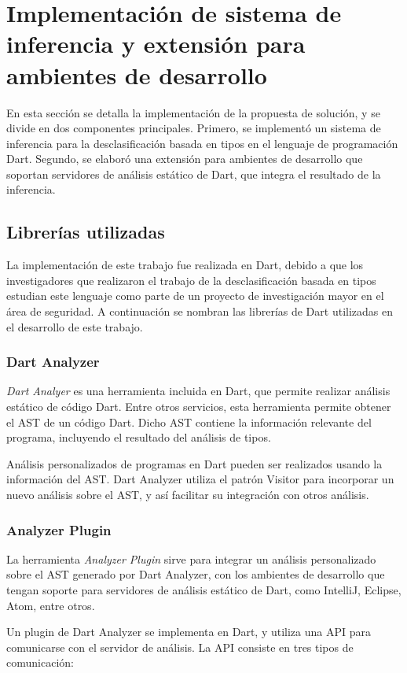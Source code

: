 \chapter{Implementación de sistema de inferencia y extensión para ambientes de desarrollo}
En esta sección se detalla la implementación de la propuesta de solución, y se divide en dos componentes principales. Primero, se implementó un sistema de inferencia para la desclasificación basada en tipos en el lenguaje de programación Dart. Segundo, se elaboró una extensión para ambientes de desarrollo que soportan servidores de análisis estático de Dart, que integra el resultado de la inferencia.

\section{Librerías utilizadas}
La implementación de este trabajo fue realizada en Dart, debido a que los investigadores que realizaron el trabajo de la desclasificación basada en tipos estudian este lenguaje como parte de un proyecto de investigación mayor en el área de seguridad. A continuación se nombran las librerías de Dart utilizadas en el desarrollo de este trabajo.

\subsection{Dart Analyzer}
\emph{Dart Analyer} es una herramienta incluida en Dart, que permite realizar análisis estático de código Dart. Entre otros servicios, esta herramienta permite obtener el AST de un código Dart. Dicho AST contiene la información relevante del programa, incluyendo el resultado del análisis de tipos.

Análisis personalizados de programas en Dart pueden ser realizados usando la información del AST. Dart Analyzer utiliza el patrón Visitor para incorporar un nuevo análisis sobre el AST, y así facilitar su integración con otros análisis.

\subsection{Analyzer Plugin}
La herramienta \emph{Analyzer Plugin} sirve para integrar un análisis personalizado sobre el AST generado por Dart Analyzer, con los ambientes de desarrollo que tengan soporte para servidores de análisis estático de Dart, como IntelliJ, Eclipse, Atom, entre otros.

Un plugin de Dart Analyzer se implementa en Dart, y utiliza una API para comunicarse con el servidor de análisis. La API consiste en tres tipos de comunicación:

